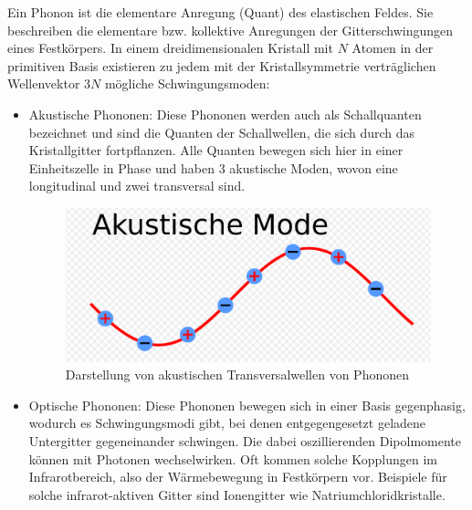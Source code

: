 \label{q:29}

Ein Phonon ist die elementare Anregung (Quant) des elastischen Feldes. Sie beschreiben die elementare bzw. kollektive Anregungen der Gitterschwingungen eines Festkörpers.
In einem dreidimensionalen Kristall mit $N$ Atomen in der primitiven Basis existieren zu jedem mit der Kristallsymmetrie verträglichen Wellenvektor 
$3N$ mögliche Schwingungsmoden:

\begin{itemize}
    \item Akustische Phononen: Diese Phononen werden auch als Schallquanten bezeichnet und sind die Quanten der Schallwellen, die sich durch das Kristallgitter fortpflanzen.
          Alle Quanten bewegen sich hier in einer Einheitszelle in Phase und haben 3 akustische Moden, wovon eine longitudinal und zwei transversal sind.

          \begin{figure}[H]
            \centering
            \begin{samepage}
                \includegraphics[width=0.8\linewidth]{resources/09-05-2012/akust.PNG}
                \caption[Akustische Transversalwellen Phononen]{Darstellung von akustischen Transversalwellen von Phononen}
                \label{fig:akustische_transversalwellen_phononen}
            \end{samepage}
          \end{figure}

    \item Optische Phononen: Diese Phononen bewegen sich in einer Basis gegenphasig, wodurch es Schwingungsmodi gibt, bei denen entgegengesetzt geladene Untergitter gegeneinander schwingen. 
          Die dabei oszillierenden Dipolmomente können mit Photonen wechselwirken. Oft kommen solche Kopplungen im Infrarotbereich, also der Wärmebewegung in Festkörpern vor.
          Beispiele für solche infrarot-aktiven Gitter sind Ionengitter wie Natriumchloridkristalle.


\end{itemize}
